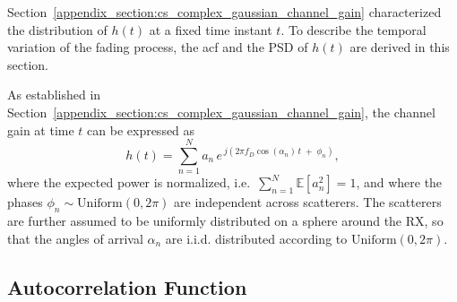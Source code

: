 Section~\ref{appendix_section:cs_complex_gaussian_channel_gain} characterized the distribution of $h(t)$ at a fixed time instant $t$.
To describe the temporal variation of the fading process, the \acf{acf} and the \acf{PSD} of $h(t)$ are derived in this section.

As established in Section~\ref{appendix_section:cs_complex_gaussian_channel_gain}, the channel gain at time $t$ can be expressed as
\begin{equation}
    h(t) = \sum_{n=1}^{N} a_n \, e^{\,j(2\pi f_D \cos(\alpha_n)\, t \;+\; \phi_n)},
\end{equation}
where the expected power is normalized, i.e.\ $\sum_{n=1}^{N} \mathbb{E}[a_n^2] = 1$, and where the phases $\phi_n \sim \mathrm{Uniform}(0, 2\pi)$ are independent across scatterers.
The scatterers are further assumed to be uniformly distributed on a sphere around the \ac{RX}, so that the angles of arrival $\alpha_n$ are \ac{i.i.d.} distributed according to $\mathrm{Uniform}(0, 2\pi)$.

\subsection*{Autocorrelation Function}
\label{appendix_section:acf_jakes_model}

